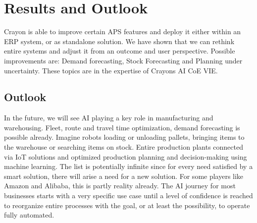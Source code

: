 \documentclass[fleqn,10pt]{SelfArx} %
\begin{document}
\section{Results and Outlook}

Crayon is able to improve certain APS features and deploy it either within an ERP system, or as standalone solution. We have shown that we can rethink entire systems and adjust it from an outcome and user perspective. Possible improvements are: Demand forecasting, Stock Forecasting and Planning under uncertainty. These topics are in the expertise of Crayons AI CoE VIE.

\subsection{Outlook}

In the future, we will see AI playing a key role in manufacturing and warehousing. Fleet, route and travel time optimization, demand forecasting is possible already. Imagine robots loading or unloading pallets, bringing items to the warehouse or searching items on stock. Entire production plants connected via IoT solutions and optimized production planning and decision-making using machine learning. The list is potentially infinite since for every need satisfied by a smart solution, there will arise a need for a new solution. For some players like Amazon and Alibaba, this is partly reality already. The AI journey for most businesses starts with a very specific use case until a level of confidence is reached to reorganize entire processes with the goal, or at least the possibility, to operate fully automated. 






\end{document}
